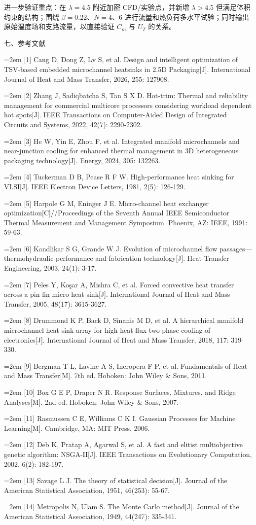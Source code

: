 \documentclass[12pt]{article}
\newcommand{\sect}[1]{\par\vspace{12pt}\noindent\begin{center}{\fontsize{14pt}{20pt}\selectfont\hei #1}\end{center}\vspace{4pt}}
\begin{document}
进一步验证重点：在 $\lambda = 4.5$ 附近加密 CFD/实验点，并新增 $\lambda > 4.5$ 但满足体积约束的结构；围绕 $\beta = 0.22$、$N = 4$、6 进行流量和热负荷多水平试验；同时输出原始温度场和支路流量，以直接验证 $C_m$ 与 $U_T$ 的关系。

\sect{七、参考文献}
\begingroup
\small
\setlength{\parindent}{0pt}
\setlength{\parskip}{3pt}
\newcommand{\refitem}[1]{\par\hangindent=2em #1}
\refitem{[1] Cang D, Dong Z, Lv S, et al. Design and intelligent optimization of TSV-based embedded microchannel heatsinks in 2.5D Packaging[J]. International Journal of Heat and Mass Transfer, 2026, 255: 127908.}
\refitem{[2] Zhang J, Sadiqbatcha S, Tan S X D. Hot-trim: Thermal and reliability management for commercial multicore processors considering workload dependent hot spots[J]. IEEE Transactions on Computer-Aided Design of Integrated Circuits and Systems, 2022, 42(7): 2290-2302.}
\refitem{[3] He W, Yin E, Zhou F, et al. Integrated manifold microchannels and near-junction cooling for enhanced thermal management in 3D heterogeneous packaging technology[J]. Energy, 2024, 305: 132263.}
\refitem{[4] Tuckerman D B, Pease R F W. High-performance heat sinking for VLSI[J]. IEEE Electron Device Letters, 1981, 2(5): 126-129.}
\refitem{[5] Harpole G M, Eninger J E. Micro-channel heat exchanger optimization[C]//Proceedings of the Seventh Annual IEEE Semiconductor Thermal Measurement and Management Symposium. Phoenix, AZ: IEEE, 1991: 59-63.}
\refitem{[6] Kandlikar S G, Grande W J. Evolution of microchannel flow passages---thermohydraulic performance and fabrication technology[J]. Heat Transfer Engineering, 2003, 24(1): 3-17.}
\refitem{[7] Peles Y, Koşar A, Mishra C, et al. Forced convective heat transfer across a pin fin micro heat sink[J]. International Journal of Heat and Mass Transfer, 2005, 48(17): 3615-3627.}
\refitem{[8] Drummond K P, Back D, Sinanis M D, et al. A hierarchical manifold microchannel heat sink array for high-heat-flux two-phase cooling of electronics[J]. International Journal of Heat and Mass Transfer, 2018, 117: 319-330.}
\refitem{[9] Bergman T L, Lavine A S, Incropera F P, et al. Fundamentals of Heat and Mass Transfer[M]. 7th ed. Hoboken: John Wiley \& Sons, 2011.}
\refitem{[10] Box G E P, Draper N R. Response Surfaces, Mixtures, and Ridge Analyses[M]. 2nd ed. Hoboken: John Wiley \& Sons, 2007.}
\refitem{[11] Rasmussen C E, Williams C K I. Gaussian Processes for Machine Learning[M]. Cambridge, MA: MIT Press, 2006.}
\refitem{[12] Deb K, Pratap A, Agarwal S, et al. A fast and elitist multiobjective genetic algorithm: NSGA-II[J]. IEEE Transactions on Evolutionary Computation, 2002, 6(2): 182-197.}
\refitem{[13] Savage L J. The theory of statistical decision[J]. Journal of the American Statistical Association, 1951, 46(253): 55-67.}
\refitem{[14] Metropolis N, Ulam S. The Monte Carlo method[J]. Journal of the American Statistical Association, 1949, 44(247): 335-341.}
\endgroup
\end{document}

